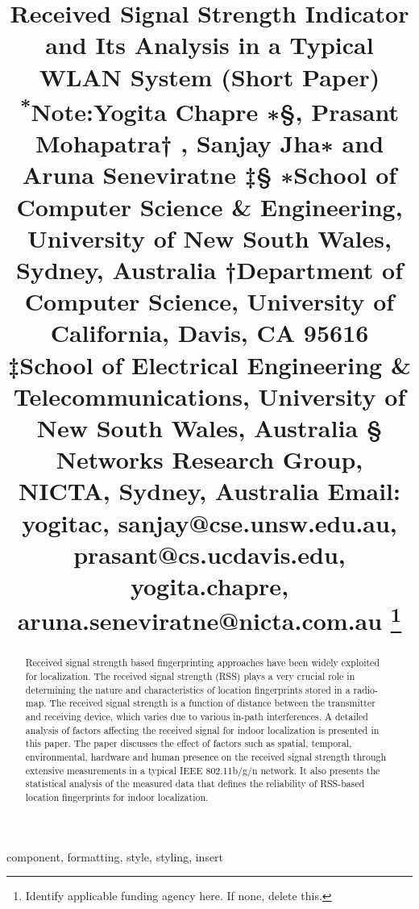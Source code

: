 \documentclass[conference]{IEEEtran}
\begin{document}
	
	\title{Received Signal Strength Indicator and Its Analysis
		in a Typical WLAN System (Short Paper)\\
		{\footnotesize \textsuperscript{*}Note:Yogita Chapre ∗§, Prasant Mohapatra†
			, Sanjay Jha∗
			and Aruna Seneviratne ‡§
			∗School of Computer Science & Engineering, University of New South Wales, Sydney, Australia
			†Department of Computer Science, University of California, Davis, CA 95616
			‡School of Electrical Engineering & Telecommunications, University of New South Wales, Australia
			§ Networks Research Group, NICTA, Sydney, Australia
			Email: {yogitac, sanjay}@cse.unsw.edu.au, prasant@cs.ucdavis.edu, {yogita.chapre, aruna.seneviratne}@nicta.com.au }
		\thanks{Identify applicable funding agency here. If none, delete this.}
	}
	
	
	\maketitle
	
	\begin{abstract}
		Received signal strength based fingerprinting approaches have been widely exploited for localization. The received
		signal strength (RSS) plays a very crucial role in determining
		the nature and characteristics of location fingerprints stored in a
		radio-map. The received signal strength is a function of distance
		between the transmitter and receiving device, which varies due
		to various in-path interferences. A detailed analysis of factors
		affecting the received signal for indoor localization is presented
		in this paper. The paper discusses the effect of factors such as
		spatial, temporal, environmental, hardware and human presence
		on the received signal strength through extensive measurements
		in a typical IEEE 802.11b/g/n network. It also presents the
		statistical analysis of the measured data that defines the reliability
		of RSS-based location fingerprints for indoor localization.
	\end{abstract}
	
	\begin{IEEEkeywords}
		component, formatting, style, styling, insert
	\end{IEEEkeywords}
	
\end{document}
